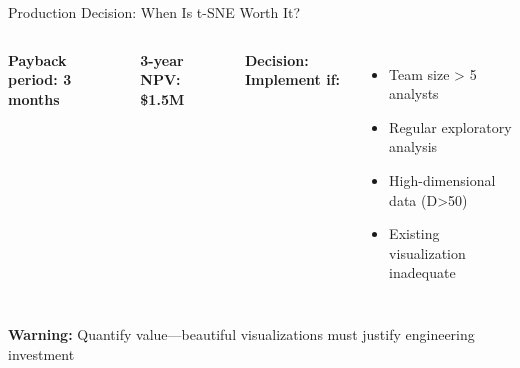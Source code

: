 \documentclass[aspectratio=169]{beamer}
\newcommand{\warning}[1]{\colorbox{red!10}{\textcolor{warningcolor}{\textbf{Warning:} #1}}}
\begin{document}
\begin{frame}{Production Decision: When Is t-SNE Worth It?}
\begin{columns}
\textbf{Payback period: 3 months}

\textbf{3-year NPV: \$1.5M}

\textbf{Decision: Implement if:}
\begin{itemize}
\item Team size > 5 analysts
\item Regular exploratory analysis
\item High-dimensional data (D>50)
\item Existing visualization inadequate
\end{itemize}
\end{columns}

\vspace{0.3cm}
\warning{Quantify value—beautiful visualizations must justify engineering investment}
\end{frame}
\end{document}
